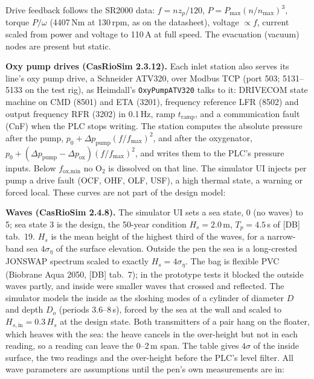 \documentclass[11pt]{article}
\begin{document}
Drive feedback follows the SR2000 data: $f = n z_p/120$, $P = P_\text{max}(n/n_\text{max})^3$,
torque $P/\omega$ (4407\,Nm at 130\,rpm, as on the datasheet), voltage $\propto f$, current
scaled from power and voltage to 110\,A at full speed. The evacuation (vacuum) nodes are present
but static.



\textbf{Oxy pump drives (CasRioSim 2.3.12).} Each inlet station also serves its line's oxy pump
drive, a Schneider ATV320, over Modbus TCP (port 503; 5131--5133 on the test rig), as Heimdall's
\texttt{OxyPumpATV320} talks to it: DRIVECOM state machine on CMD (8501) and ETA (3201), frequency
reference LFR (8502) and output frequency RFR (3202) in 0.1\,Hz, ramp $t_\text{ramp}$, and a
communication fault (CnF) when the PLC stops writing. The station computes the absolute pressure
after the pump, $p_0 + \Delta p_\text{pump}(f/f_\text{max})^2$, and after the oxygenator,
$p_0 + (\Delta p_\text{pump}-\Delta p_\text{ox})(f/f_\text{max})^2$, and writes them to the PLC's
pressure inputs. Below $f_\text{ox,min}$ no O$_2$ is dissolved on that line. The simulator UI injects
per pump a drive fault (OCF, OHF, OLF, USF), a high thermal state, a warning or forced local. These curves are not part of the design model:



\textbf{Waves (CasRioSim 2.4.8).} The simulator UI sets a sea state, 0 (no waves) to 5; sea state 3
is the design, the 50-year condition $H_s = 2.0$\,m, $T_p = 4.5$\,s of [DB] tab.~19. $H_s$ is the
mean height of the highest third of the waves, for a narrow-band sea $4\sigma_\eta$ of the surface
elevation. Outside the pen the sea is a long-crested JONSWAP spectrum scaled to exactly
$H_s = 4\sigma_\eta$. The bag is flexible PVC (Biobrane Aqua 2050, [DB] tab.~7); in the
prototype tests it blocked the outside waves partly, and inside were smaller waves that crossed and
reflected. The simulator models the inside as the sloshing modes of a cylinder of diameter $D$ and
depth $D_o$ (periods 3.6--8\,s), forced by the sea at the wall and scaled to
$H_{s,\text{in}} = 0.3\,H_s$ at the design state. Both transmitters of a pair hang on the floater,
which heaves with the sea: the heave cancels in the over-height but not in each reading, so a
reading can leave the 0--2\,m span. The table gives $4\sigma$ of the inside surface, the two
readings and the over-height before the PLC's level filter. All wave parameters are assumptions
until the pen's own measurements are in:
\begin{center}

\end{center}
\end{document}

